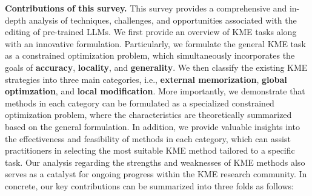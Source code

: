 \documentclass[acmsmall, screen]{acmart}
\begin{document}
\vspace{0.05in}
\noindent\textsf{\textbf{Contributions of this survey.}} This survey provides a comprehensive and in-depth analysis of techniques, challenges, and opportunities associated with the editing of pre-trained LLMs. We first provide an overview of KME tasks along with an innovative formulation. Particularly, we formulate the general KME task as a constrained optimization problem, which simultaneously incorporates the goals of \textbf{accuracy}, \textbf {locality}, and \textbf{generality}. We then classify the existing KME strategies into three main categories, i.e., \textbf{external memorization}, \textbf{global optimzation}, and \textbf{local modification}. More importantly, we demonstrate that methods in each category can be formulated as a specialized constrained optimization problem, where the characteristics are theoretically summarized based on the general formulation. In addition, we provide valuable insights into the effectiveness and feasibility of methods in each category, which can assist practitioners in selecting the most suitable KME method tailored to a specific task. 
 Our analysis regarding the strengths and weaknesses of KME methods also serves as a catalyst for ongoing progress within the KME research community. 
 In concrete, our key contributions can be summarized into three folds as follows:
\end{document}
